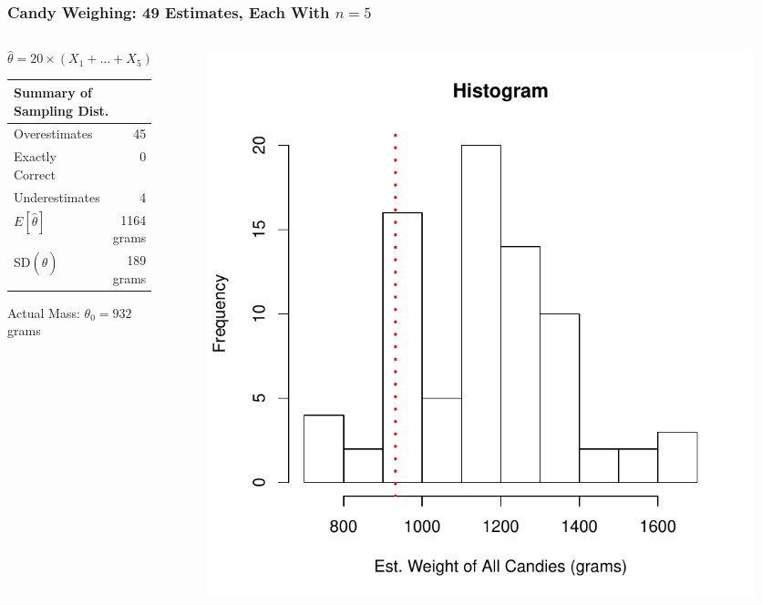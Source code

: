\documentclass[handout]{beamer}
\begin{document}
\begin{frame}
\frametitle{Candy Weighing: 49 Estimates, Each With $n=5$}

\begin{columns} 
\begin{column}[c]{5cm} 
\small

$$\widehat{\theta} = 20 \times (X_1 + \hdots + X_5)$$

\small
   \begin{tabular}{lr}
   \hline \hline
   \multicolumn{2}{l}{Summary of Sampling Dist.} \\
   \hline
   Overestimates& 45\\
   Exactly Correct& 0\\
   Underestimates& 4\\
   \hline
   $E[\hat{\theta}]$& 1164 grams\\
   SD$(\widehat{\theta})$& 189 grams\\
   \hline
   \end{tabular}
   
  \vspace{1em}
  Actual Mass:  $\theta_0 =932$ grams
\end{column} 
\begin{column}[c]{5cm} 

\begin{figure}
\centering
\includegraphics[scale = 0.4]{./images/Est_Weight_Candy}
\end{figure}

\end{column} 
\end{columns} 


\end{frame}
\end{document}
